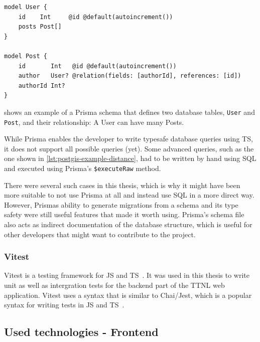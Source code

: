 \begin{lstlisting}[float, caption={Example of a Prisma schema}, label={lst:prisma-schema-example}]
model User {
    id    Int     @id @default(autoincrement())
    posts Post[]
}
    
model Post {
    id       Int   @id @default(autoincrement())
    author   User? @relation(fields: [authorId], references: [id])
    authorId Int?
}
\end{lstlisting}

 shows an example of a Prisma schema that defines two database tables, \lstinline{User} and \lstinline{Post}, and their relationship: A User can have many Posts.

While Prisma enables the developer to write typesafe database queries using \ac{TS}, it does not support all possible queries (yet).
Some advanced queries, such as the one shown in \cref{lst:postgis-example-distance}, had to be written by hand using \ac{SQL} and executed using Prisma's \lstinline|$executeRaw| method.

There were several such cases in this thesis, which is why it might have been more suitable to not use Prisma at all and instead use \ac{SQL} in a more direct way.
However, Prismas ability to generate migrations from a schema and its type safety were still useful features that made it worth using.
Prisma's schema file also acts as indirect documentation of the database structure, which is useful for other developers that might want to contribute to the project.


\subsubsection{Vitest}

Vitest is a testing framework for \ac{JS} and \ac{TS}~\cite{vitest_team_vitest_2023}.
It was used in this thesis to write unit as well as intergration tests for the backend part of the \ac{TTNL} web application.
Vitest uses a syntax that is similar to Chai/Jest, which is a popular syntax for writing tests in \ac{JS} and \ac{TS}~\cite{vitest_team_vitest_2023-1}.

\subsection{Used technologies - Frontend}

